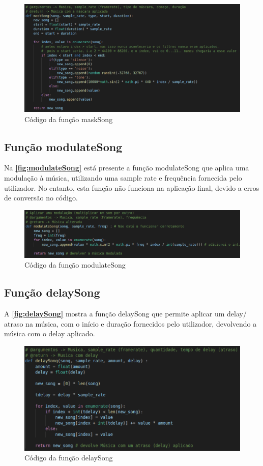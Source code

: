 \documentclass{report}
\begin{document}
\begin{figure}[!h]
\center 
\includegraphics[width=330pt]{img/maskSong.png}
\caption{Código da função maskSong}
\label{fig:maskSong}
\end{figure}

\subsection{Função modulateSong}
\label{ssec:modulateSong}
Na \textbf{\autoref{fig:modulateSong}} está presente a função modulateSong que aplica uma modulação à música, utilizando 
uma sample rate e frequência fornecida pelo utilizador. No entanto, esta função não funciona na aplicação final, 
devido a erros de conversão no código.

\begin{figure}[!h]
\center 
\includegraphics[width=330pt]{img/modulateSong.png}
\caption{Código da função modulateSong}
\label{fig:modulateSong}
\end{figure}

\subsection{Função delaySong}
\label{ssec:delaySong}
A \textbf{\autoref{fig:delaySong}} mostra a função delaySong que permite aplicar um delay/ atraso na música, com o início e
duração fornecidos pelo utilizador, devolvendo a música com o delay aplicado.

\begin{figure}[!h]
\center 
\includegraphics[width=330pt]{img/delaySong.png}
\caption{Código da função delaySong}
\label{fig:delaySong}
\end{figure}
\end{document}
